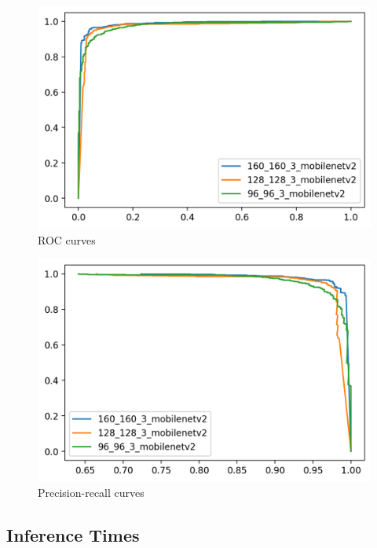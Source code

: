 \documentclass[12pt,a4paper]{article}
\begin{document}
\begin{figure}[H]
\centering
\includegraphics[width=13cm]{roc_curves.png}
\caption{ROC curves}
\label{figure:roc_curves}
\end{figure}

\begin{figure}[H]
\centering
\includegraphics[width=13cm]{precision_recall_curves.png}
\caption{Precision-recall curves}
\label{figure:precision_recall_curves}
\end{figure}


\subsection{Inference Times}
\end{document}

